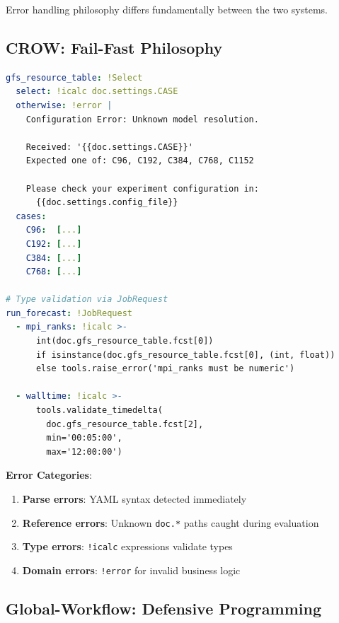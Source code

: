 \documentclass[11pt,twoside]{article}
\newcommand{\crow}{\textsc{CROW}}
\begin{document}
Error handling philosophy differs fundamentally between the two systems.

\subsection{CROW: Fail-Fast Philosophy}

\begin{lstlisting}[language=YAML, caption={\crow{} Comprehensive Error Handling}]
gfs_resource_table: !Select
  select: !icalc doc.settings.CASE
  otherwise: !error |
    Configuration Error: Unknown model resolution.
    
    Received: '{{doc.settings.CASE}}'
    Expected one of: C96, C192, C384, C768, C1152
    
    Please check your experiment configuration in:
      {{doc.settings.config_file}}
  cases:
    C96:  [...]
    C192: [...]
    C384: [...]
    C768: [...]

# Type validation via JobRequest
run_forecast: !JobRequest
  - mpi_ranks: !icalc >-
      int(doc.gfs_resource_table.fcst[0])
      if isinstance(doc.gfs_resource_table.fcst[0], (int, float))
      else tools.raise_error('mpi_ranks must be numeric')
      
  - walltime: !icalc >-
      tools.validate_timedelta(
        doc.gfs_resource_table.fcst[2],
        min='00:05:00',
        max='12:00:00')
\end{lstlisting}

\textbf{Error Categories}:
\begin{enumerate}[leftmargin=2em]
    \item \textbf{Parse errors}: YAML syntax detected immediately
    \item \textbf{Reference errors}: Unknown \texttt{doc.*} paths caught during evaluation
    \item \textbf{Type errors}: \texttt{!icalc} expressions validate types
    \item \textbf{Domain errors}: \texttt{!error} for invalid business logic
\end{enumerate}

\subsection{Global-Workflow: Defensive Programming}
\end{document}
